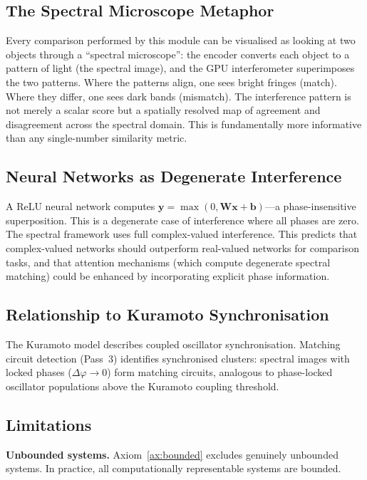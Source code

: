 \documentclass[11pt,twocolumn,a4paper]{article}
\begin{document}
\subsection{The Spectral Microscope Metaphor}

Every comparison performed by this module can be visualised as looking
at two objects through a ``spectral microscope'': the encoder converts
each object to a pattern of light (the spectral image), and the GPU
interferometer superimposes the two patterns. Where the patterns align,
one sees bright fringes (match). Where they differ, one sees dark bands
(mismatch). The interference pattern is not merely a scalar score but a
spatially resolved map of agreement and disagreement across the spectral
domain. This is fundamentally more informative than any single-number
similarity metric.

\subsection{Neural Networks as Degenerate Interference}

A ReLU neural network computes
$\mathbf{y} = \max(0, \mathbf{W}\mathbf{x} + \mathbf{b})$---a
phase-insensitive superposition. This is a degenerate case of
interference where all phases are zero. The spectral framework uses full
complex-valued interference. This predicts that complex-valued networks
\citep{trabelsi2018} should outperform real-valued networks for
comparison tasks, and that attention mechanisms \citep{vaswani2017}
(which compute degenerate spectral matching) could be enhanced by
incorporating explicit phase information.

\subsection{Relationship to Kuramoto Synchronisation}

The Kuramoto model \citep{kuramoto1975, strogatz2000} describes coupled
oscillator synchronisation. Matching circuit detection (Pass~3) identifies
synchronised clusters: spectral images with locked phases
($\Delta\varphi \to 0$) form matching circuits, analogous to phase-locked
oscillator populations above the Kuramoto coupling threshold.

\subsection{Limitations}

\textbf{Unbounded systems.} Axiom~\ref{ax:bounded} excludes genuinely
unbounded systems. In practice, all computationally representable
systems are bounded.
\end{document}
